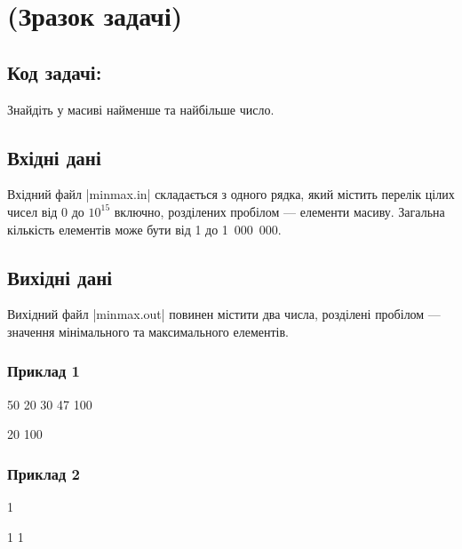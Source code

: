 \section*{(Зразок задачі) \hfill {}}


\subsection*{Код задачі: }

Знайдіть у масиві найменше та найбільше число.


\subsection*{Вхідні дані}

Вхідний файл |minmax.in| складається з одного рядка, який містить перелік цілих чисел від 0 до \(10 ^ {15}\) включно, розділених пробілом --- елементи масиву. Загальна кількість елементів може бути від 1 до 1~000~000.


\subsection*{Вихідні дані}

Вихідний файл |minmax.out| повинен містити два числа, розділені пробілом --- значення мінімального та максимального елементів.


\subsubsection*{Приклад 1}

\textbf{}

\begin{codeblock}
50 20 30 47 100
\end{codeblock}

\textbf{}

\begin{codeblock}
20 100
\end{codeblock}


\subsubsection*{Приклад 2}

\textbf{}

\begin{codeblock}
1
\end{codeblock}

\textbf{}

\begin{codeblock}
1 1
\end{codeblock}
